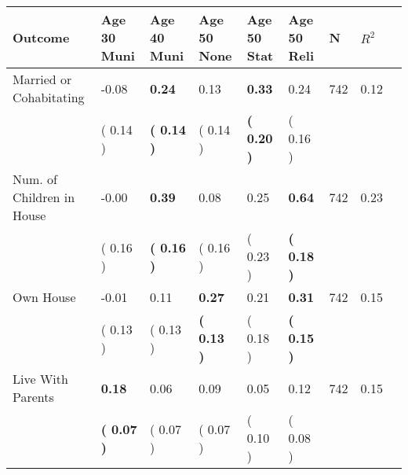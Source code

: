 \begin{tabular}{L{6.2cm} C{1.8cm} C{1.8cm} C{1.8cm} C{1.8cm} C{1.8cm} C{1.8cm} C{0.3cm} C{0.3cm}}
\toprule
 \textbf{Outcome} & \textbf{Age 30 Muni} & \textbf{Age 40 Muni} & \textbf{Age 50 None} & \textbf{Age 50 Stat} & \textbf{Age 50 Reli} & \textbf{N} & \textbf{$ R^2$} \\
\midrule
Married or Cohabitating &     -0.08 & \textbf{     0.24} &      0.13 & \textbf{     0.33} &      0.24  & 742 &       0.12 \\ 
 & (     0.14 ) & \textbf{(     0.14 )} & (     0.14 ) & \textbf{(     0.20 )} & (     0.16 )  & \\
Num. of Children in House &     -0.00 & \textbf{     0.39} &      0.08 &      0.25 & \textbf{     0.64}  & 742 &       0.23 \\ 
 & (     0.16 ) & \textbf{(     0.16 )} & (     0.16 ) & (     0.23 ) & \textbf{(     0.18 )}  & \\
Own House &     -0.01 &      0.11 & \textbf{     0.27} &      0.21 & \textbf{     0.31}  & 742 &       0.15 \\ 
 & (     0.13 ) & (     0.13 ) & \textbf{(     0.13 )} & (     0.18 ) & \textbf{(     0.15 )}  & \\
Live With Parents & \textbf{     0.18} &      0.06 &      0.09 &      0.05 &      0.12  & 742 &       0.15 \\ 
 & \textbf{(     0.07 )} & (     0.07 ) & (     0.07 ) & (     0.10 ) & (     0.08 )  & \\
\bottomrule
\end{tabular}
